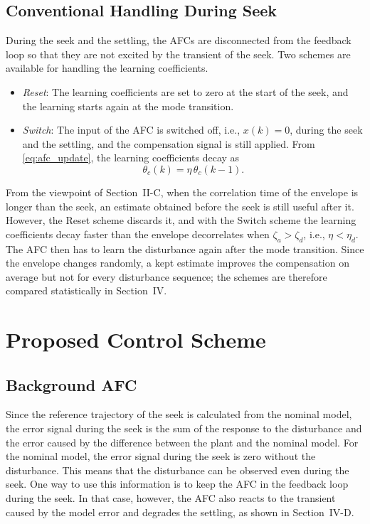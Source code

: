 \documentclass[conference]{IEEEtran}
\newcommand{\thc}{\theta_c}              %
\newcommand{\etad}{\eta_d}               %
\begin{document}
\subsection{Conventional Handling During Seek}
During the seek and the settling, the AFCs are disconnected from the feedback
loop so that they are not excited by the transient of the seek. Two schemes
are available for handling the learning coefficients.
\begin{itemize}
\item \textit{Reset}: The learning coefficients are set to zero at the start of
the seek, and the learning starts again at the mode transition.
\item \textit{Switch}: The input of the AFC is switched off, i.e., $x(k) = 0$,
during the seek and the settling, and the compensation signal is still
applied. From \eqref{eq:afc_update}, the learning coefficients decay as
\begin{equation}
\thc(k) = \eta\,\thc(k-1). \label{eq:switch}
\end{equation}
\end{itemize}
From the viewpoint of Section~II-C, when the correlation time of the envelope
is longer than the seek, an estimate obtained before the seek is still useful
after it. However, the Reset scheme discards it, and with the Switch scheme the
learning coefficients decay faster than the envelope decorrelates when
$\zeta_a > \zeta_d$, i.e., $\eta < \etad$. The AFC then has to learn the
disturbance again after the mode transition. Since the envelope changes
randomly, a kept estimate improves the compensation on average but not for
every disturbance sequence; the schemes are therefore compared statistically
in Section~IV.

\section{Proposed Control Scheme}

\subsection{Background AFC}
Since the reference trajectory of the seek is calculated from the nominal
model, the error signal during the seek is the sum of the response to the
disturbance and the error caused by the difference between the plant and the
nominal model. For the nominal model, the error signal during the seek is zero
without the disturbance. This means that the disturbance can be observed even
during the seek. One way to use this information is to keep the AFC in the
feedback loop during the seek. In that case, however, the AFC also reacts to
the transient caused by the model error and degrades the settling, as shown in
Section~IV-D.
\end{document}
